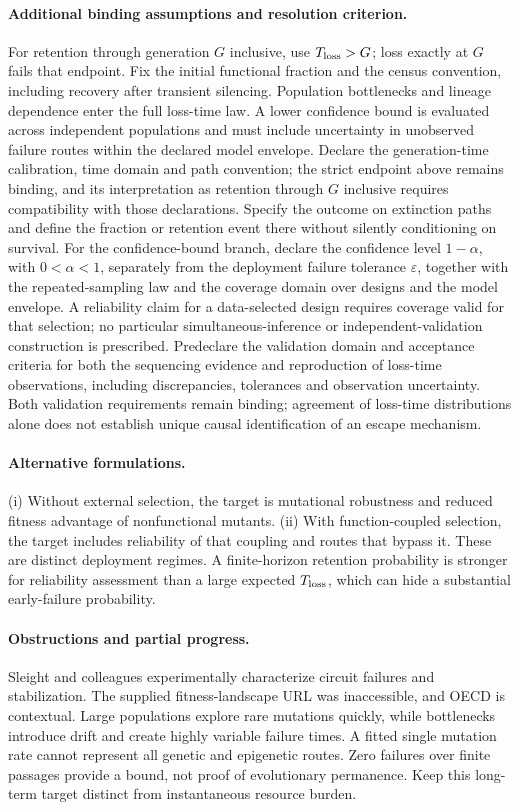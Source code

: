 \documentclass[11pt]{article}
\begin{document}
\paragraph{Additional binding assumptions and resolution criterion.} For retention through generation $G$ inclusive, use $T_{\rm loss}>G$; loss exactly at $G$ fails that endpoint. Fix the initial functional fraction and the census convention, including recovery after transient silencing. Population bottlenecks and lineage dependence enter the full loss-time law. A lower confidence bound is evaluated across independent populations and must include uncertainty in unobserved failure routes within the declared model envelope. Declare the generation-time calibration, time domain and path convention; the strict endpoint above remains binding, and its interpretation as retention through $G$ inclusive requires compatibility with those declarations. Specify the outcome on extinction paths and define the fraction or retention event there without silently conditioning on survival. For the confidence-bound branch, declare the confidence level $1-\alpha$, with $0<\alpha<1$, separately from the deployment failure tolerance $\varepsilon$, together with the repeated-sampling law and the coverage domain over designs and the model envelope. A reliability claim for a data-selected design requires coverage valid for that selection; no particular simultaneous-inference or independent-validation construction is prescribed. Predeclare the validation domain and acceptance criteria for both the sequencing evidence and reproduction of loss-time observations, including discrepancies, tolerances and observation uncertainty. Both validation requirements remain binding; agreement of loss-time distributions alone does not establish unique causal identification of an escape mechanism.

\paragraph{Alternative formulations.} (i) Without external selection, the target is mutational robustness and reduced fitness advantage of nonfunctional mutants. (ii) With function-coupled selection, the target includes reliability of that coupling and routes that bypass it. These are distinct deployment regimes. A finite-horizon retention probability is stronger for reliability assessment than a large expected $T_{\rm loss}$, which can hide a substantial early-failure probability.

\paragraph{Obstructions and partial progress.} Sleight and colleagues experimentally characterize circuit failures and stabilization. The supplied fitness-landscape URL was inaccessible, and OECD is contextual. Large populations explore rare mutations quickly, while bottlenecks introduce drift and create highly variable failure times. A fitted single mutation rate cannot represent all genetic and epigenetic routes. Zero failures over finite passages provide a bound, not proof of evolutionary permanence. Keep this long-term target distinct from instantaneous resource burden.
\end{document}
